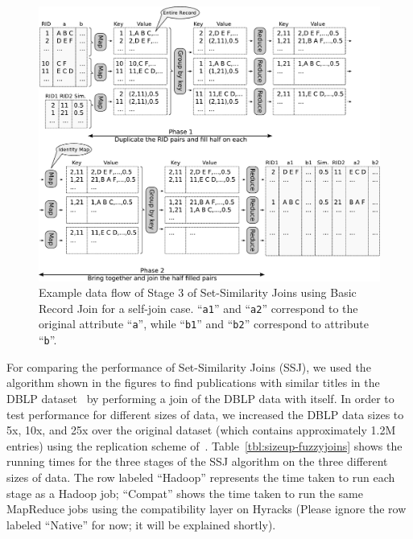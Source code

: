     \begin{figure}
    \center
    \includegraphics[scale=0.7]{images/fuzzyjoin-recordpairsbasic}
    \caption{Example data flow of Stage 3 of Set-Similarity Joins using
      Basic Record Join for a self-join case. ``\texttt{a1}'' and
      ``\texttt{a2}'' correspond to the original attribute
      ``\texttt{a}'', while ``\texttt{b1}'' and ``\texttt{b2}''
      correspond to attribute ``\texttt{b}''.}
    \label{fig:fuzzyjoin-recordparisbasic}
    \end{figure}
For comparing the performance of Set-Similarity Joins (SSJ), we used the algorithm shown in the figures to find publications with similar titles in the DBLP
dataset~\cite{dblp:xml} by performing a
join of the DBLP data with itself. In order to test performance for different sizes of data, we increased the DBLP data sizes to 5x, 10x, and 25x over the original dataset
(which contains
approximately 1.2M entries) using the replication scheme of~\cite{FuzzyJoinMR}. Table~\ref{tbl:sizeup-fuzzyjoins} shows the running times for the three
stages of the SSJ algorithm on the three different sizes of data. The row labeled ``Hadoop'' represents the time taken to run each stage as a Hadoop job; ``Compat'' shows the
time taken to run the same MapReduce jobs using the compatibility layer on Hyracks (Please ignore the row labeled ``Native'' for now; it will be explained shortly).

